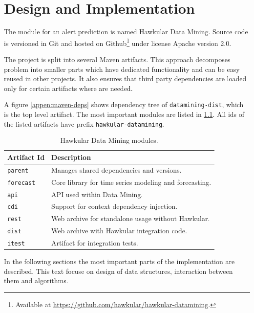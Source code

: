 \chapter{Design and Implementation} \label{chap:design-im[pl}
The module for an alert prediction is named Hawkular Data Mining. Source code is versioned in Git and
hosted on Github\footnote{Available at \url{https://github.com/hawkular/hawkular-datamining}.} under
license Apache version 2.0.

The project is split into several Maven artifacts. This approach decomposes problem into smaller parts
which have dedicated functionality and can be easy reused in other projects. It also ensures that
third party dependencies are loaded only for certain artifacts where are needed.

A figure \ref{appen:maven-deps} shows dependency tree of \texttt{datamining-dist}, which is the top level artifact.
The most important modules are listed in \ref{tab:datamining-modules}. All ids of the listed artifacts have prefix
\texttt{hawkular-datamining}.

\begin{table}[h]
    \begin{center}
        \begin{tabular}{l|l}
            \textbf{Artifact Id} & \textbf{Description} \\ \hline \hline
            \texttt{parent} & Manages shared dependencies and versions. \\
            \texttt{forecast} & Core library for time series modeling and forecasting. \\
            \texttt{api} & API used within Data Mining. \\
            \texttt{cdi} & Support for context dependency injection. \\
            \texttt{rest} & Web archive for standalone usage without Hawkular. \\
            \texttt{dist} & Web archive with Hawkular integration code. \\
            \texttt{itest} & Artifact for integration tests.
        \end{tabular}
        \caption{Hawkular Data Mining modules.}
        \label{tab:datamining-modules}
    \end{center}
\end{table}

In the following sections the most important parts of the implementation are described. This text focuse on
design of data structures, interaction between them and algorithms.

